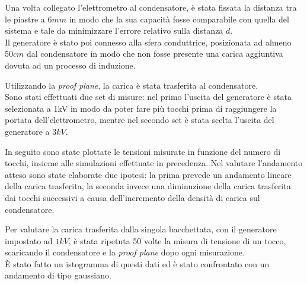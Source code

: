 {\fontsize{12}{14}\selectfont 

Una volta collegato l'elettrometro al condensatore, è stata fissata la distanza tra le piastre a $6mm$ in modo che la sua capacità fosse comparabile con quella del sistema e tale da minimizzare l'errore relativo sulla distanza $d$.
\\
Il generatore è stato poi connesso alla sfera conduttrice, posizionata ad almeno $50cm$ dal condensatore in modo che non fosse presente una carica aggiuntiva dovuta ad un processo di induzione. 
\par
Utilizzando la \emph{proof plane}, la carica è stata trasferita al condensatore.
\\
Sono stati effettuati due set di misure: nel primo l'uscita del generatore è stata selezionata a 1kV in modo da poter fare più tocchi prima di raggiungere la portata dell'elettrometro, mentre nel secondo set è stata scelta l'uscita del generatore a $3kV$.
\par
In seguito sono state plottate le tensioni misurate in funzione del numero di tocchi, insieme alle simulazioni effettuate in precedenza. Nel valutare l'andamento atteso sono state elaborate due ipotesi: la prima prevede un andamento lineare della carica trasferita, la seconda invece una diminuzione della carica trasferita dai tocchi successivi a causa  dell'incremento della densità di carica sul condensatore.
\par
Per valutare la carica trasferita dalla singola bacchettata, con il generatore impostato ad $1kV$, è stata ripetuta 50 volte la misura di tensione di un tocco, scaricando il condensatore e la \emph{proof plane} dopo ogni misurazione.
\\
È stato fatto un istogramma di questi dati ed è stato confrontato con un andamento di tipo gaussiano.
\par}